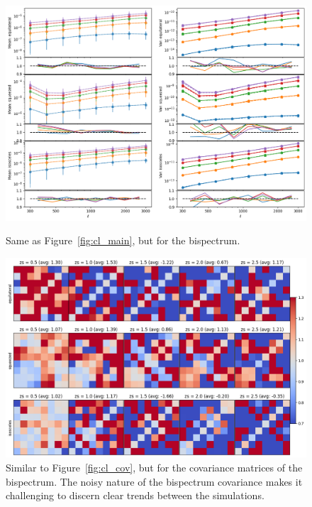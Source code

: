 \begin{figure}[p]
    \centering
    \includegraphics[width=\textwidth]{figures/results/bl_main.png}
    \caption{Same as Figure~\ref{fig:cl_main}, but for the bispectrum. }
    \label{fig:bl_main}
    \vspace{0.5cm}
    \includegraphics[width=\textwidth]{figures/results/bl_cov.png}
    \caption{Similar to Figure~\ref{fig:cl_cov}, but for the covariance matrices of the bispectrum. The noisy nature of the bispectrum covariance makes it challenging to discern clear trends between the simulations.}
    \label{fig:bl_cov}
\end{figure}

